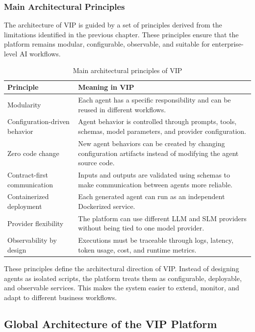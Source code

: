 \subsubsection{Main Architectural Principles}

The architecture of VIP is guided by a set of principles derived from the limitations identified in the previous chapter. These principles ensure that the platform remains modular, configurable, observable, and suitable for enterprise-level AI workflows.

\begin{table}[H]
\centering
\small
\caption{Main architectural principles of VIP}
\label{tab:vip_architectural_principles}
\begin{tabular}{|p{4cm}|p{9cm}|}
\hline
\textbf{Principle} & \textbf{Meaning in VIP} \\
\hline
Modularity & Each agent has a specific responsibility and can be reused in different workflows. \\
\hline
Configuration-driven behavior & Agent behavior is controlled through prompts, tools, schemas, model parameters, and provider configuration. \\
\hline
Zero code change & New agent behaviors can be created by changing configuration artifacts instead of modifying the agent source code. \\
\hline
Contract-first communication & Inputs and outputs are validated using schemas to make communication between agents more reliable. \\
\hline
Containerized deployment & Each generated agent can run as an independent Dockerized service. \\
\hline
Provider flexibility & The platform can use different LLM and SLM providers without being tied to one model provider. \\
\hline
Observability by design & Executions must be traceable through logs, latency, token usage, cost, and runtime metrics. \\
\hline
\end{tabular}
\end{table}

These principles define the architectural direction of VIP. Instead of designing agents as isolated scripts, the platform treats them as configurable, deployable, and observable services. This makes the system easier to extend, monitor, and adapt to different business workflows.
\subsection{Global Architecture of the VIP Platform}


